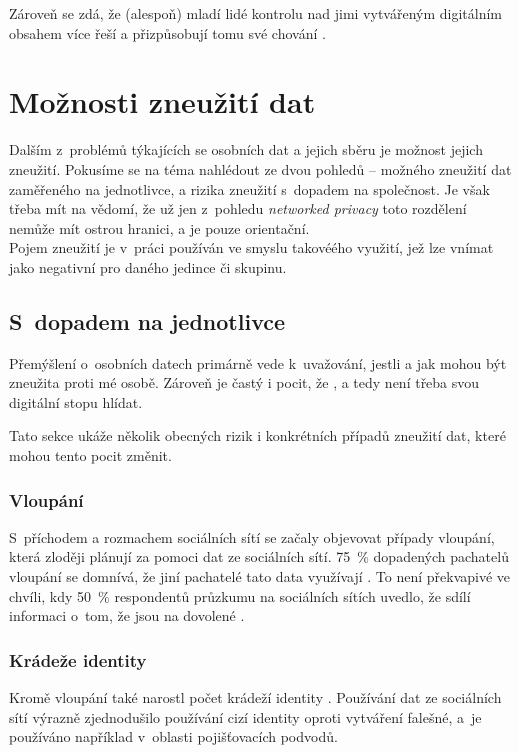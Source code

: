 Zároveň se zdá, že (alespoň) mladí lidé kontrolu nad jimi vytvářeným digitálním obsahem více řeší a přizpůsobují tomu své chování \citep{youth-online-behavior}.

\section{Možnosti zneužití dat}
Dalším z~problémů týkajících se osobních dat a jejich sběru je možnost jejich zneužití. Pokusíme se na téma nahlédout ze dvou pohledů -- možného zneužití dat zaměřeného na jednotlivce, a rizika zneužití s~dopadem na společnost. Je však třeba mít na vědomí, že už jen z~pohledu \textit{networked privacy} toto rozdělení nemůže mít ostrou hranici, a je pouze orientační.\\
Pojem zneužití je v~práci používán ve smyslu takovéého využití, jež lze vnímat jako negativní pro daného jedince či skupinu.

\subsection{S~dopadem na jednotlivce}
Přemýšlení o~osobních datech primárně vede k~uvažování, jestli a jak mohou být zneužita proti mé osobě. Zároveň je častý i pocit, že , a tedy není třeba svou digitální stopu hlídat.

Tato sekce ukáže několik obecných rizik i konkrétních případů zneužití dat, které mohou tento pocit změnit.

\subsubsection*{Vloupání}
S~příchodem a rozmachem sociálních sítí se začaly objevovat případy vloupání, která zloději plánují za pomoci dat ze sociálních sítí. 75~\% dopadených pachatelů vloupání se domnívá, že jiní pachatelé tato data využívají \citep{burglary}.
To není překvapivé ve chvíli, kdy 50~\% respondentů průzkumu na sociálních sítích uvedlo, že sdílí informaci o~tom, že jsou na dovolené \citep{burglary}. 

\subsubsection*{Krádeže identity}
Kromě vloupání také narostl počet krádeží identity \citep{identity-theft-rise}.
Používání dat ze sociálních sítí výrazně zjednodušilo používání cizí identity oproti vytváření falešné, a~je používáno například v~oblasti pojišťovacích podvodů. 

